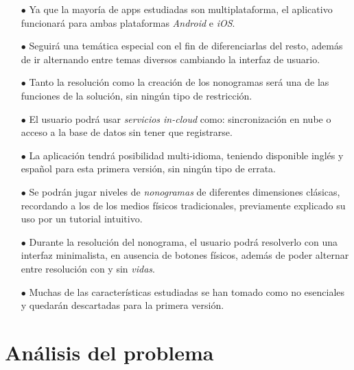 \documentclass[11pt,spanish,listoffigures,listoftables]{tfgetsinf}
\begin{document}
\begin{itemize}
  \item[$\bullet$] Ya que la mayoría de apps estudiadas son multiplataforma, el aplicativo funcionará para ambas plataformas \textit{Android} e \textit{iOS}.
  \item[$\bullet$] Seguirá una temática especial con el fin de diferenciarlas del resto, además de ir alternando entre temas diversos cambiando
  la interfaz de usuario.
  \item[$\bullet$] Tanto la resolución como la creación de los nonogramas será una de las funciones de la solución, sin ningún tipo de restricción.
  \item[$\bullet$] El usuario podrá usar \textit{servicios in-cloud} como: sincronización en nube o acceso a la base de datos sin tener que registrarse.
  \item[$\bullet$] La aplicación tendrá posibilidad multi-idioma, teniendo disponible inglés y español para esta primera versión, sin ningún tipo de errata.
  \item[$\bullet$] Se podrán jugar niveles de \textit{nonogramas} de diferentes dimensiones clásicas, recordando a los de los medios físicos tradicionales,
  previamente explicado su uso por un tutorial intuitivo. 
  \item[$\bullet$] Durante la resolución del nonograma, el usuario podrá resolverlo con una interfaz minimalista, en ausencia de botones físicos,
  además de poder alternar entre resolución con y sin \textit{vidas}.
  \item[$\bullet$] Muchas de las características estudiadas se han tomado como no esenciales y quedarán descartadas para la primera versión.
\end{itemize}

\chapter{Análisis del problema}

\end{document}

